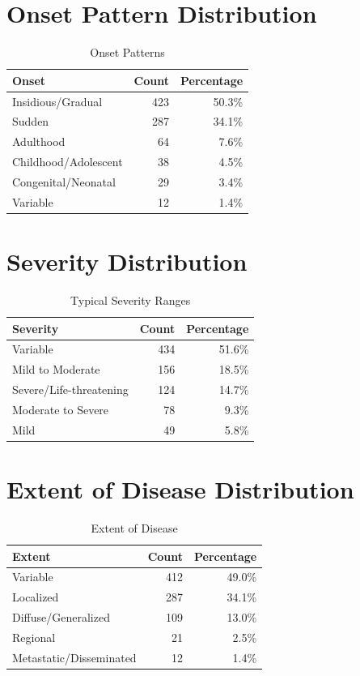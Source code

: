 \section{Onset Pattern Distribution}
\label{sec:onset_distribution}

\begin{table}[htbp]
\centering
\caption{Onset Patterns}
\label{tab:onset_dist}
\begin{tabular}{lrr}
\toprule
\textbf{Onset} & \textbf{Count} & \textbf{Percentage} \\
\midrule
Insidious/Gradual & 423 & 50.3\% \\
Sudden & 287 & 34.1\% \\
Adulthood & 64 & 7.6\% \\
Childhood/Adolescent & 38 & 4.5\% \\
Congenital/Neonatal & 29 & 3.4\% \\
Variable & 12 & 1.4\% \\
\bottomrule
\end{tabular}
\end{table}

\section{Severity Distribution}
\label{sec:severity_distribution}

\begin{table}[htbp]
\centering
\caption{Typical Severity Ranges}
\label{tab:severity_dist}
\begin{tabular}{lrr}
\toprule
\textbf{Severity} & \textbf{Count} & \textbf{Percentage} \\
\midrule
Variable & 434 & 51.6\% \\
Mild to Moderate & 156 & 18.5\% \\
Severe/Life-threatening & 124 & 14.7\% \\
Moderate to Severe & 78 & 9.3\% \\
Mild & 49 & 5.8\% \\
\bottomrule
\end{tabular}
\end{table}

\section{Extent of Disease Distribution}
\label{sec:extent_distribution}

\begin{table}[htbp]
\centering
\caption{Extent of Disease}
\label{tab:extent_dist}
\begin{tabular}{lrr}
\toprule
\textbf{Extent} & \textbf{Count} & \textbf{Percentage} \\
\midrule
Variable & 412 & 49.0\% \\
Localized & 287 & 34.1\% \\
Diffuse/Generalized & 109 & 13.0\% \\
Regional & 21 & 2.5\% \\
Metastatic/Disseminated & 12 & 1.4\% \\
\bottomrule
\end{tabular}
\end{table}

